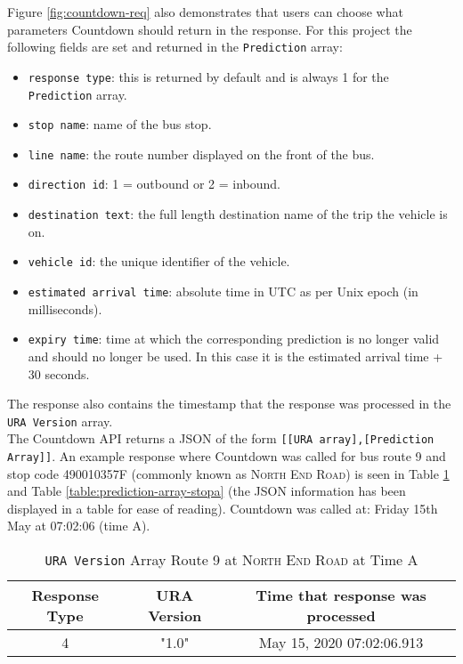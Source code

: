 Figure \ref{fig:countdown-req} also demonstrates that users can choose what parameters Countdown should return in the response. For this project the following fields are set and returned in the \texttt{Prediction} array: 
\begin{itemize}
    \item \texttt{response type}: this is returned by default and is always 1 for the \texttt{Prediction} array.
    \item \texttt{stop name}: name of the bus stop.
    \item \texttt{line name}: the route number displayed on the front of the bus.
    \item \texttt{direction id}: 1 = outbound or 2 = inbound.
    \item \texttt{destination text}: the full length destination name of the trip the vehicle is on.
    \item \texttt{vehicle id}: the unique identifier of the vehicle.
    \item \texttt{estimated arrival time}: absolute time in UTC as per Unix epoch (in milliseconds).
    \item \texttt{expiry time}: time at which the corresponding prediction is no longer valid and should no longer be used. In this case it is the estimated arrival time + 30 seconds. 
\end{itemize}
The response also contains the timestamp that the response was processed in the \texttt{URA Version} array. \\

The Countdown API returns a JSON of the form \texttt{[[URA array],[Prediction Array]]}. An example response where Countdown was called for bus route 9 and stop code 490010357F (commonly known as \textsc{North End Road}) is seen in Table \ref{table:ura-array-stopa} and Table \ref{table:prediction-array-stopa} (the JSON information has been displayed in a table for ease of reading). Countdown was called at: Friday 15th May at 07:02:06 (time A).

\begin{table}[H]
    \centering
    \begin{tabular}{|c|c|c|}
        \hline
          Response Type & URA Version & Time that response was processed \\
        \hline
           4  & "1.0" & May 15, 2020 07:02:06.913 \\
        \hline
        \end{tabular}
    \caption{\texttt{URA Version} Array Route 9 at \textsc{North End Road} at Time A}
    \label{table:ura-array-stopa}
\end{table}

